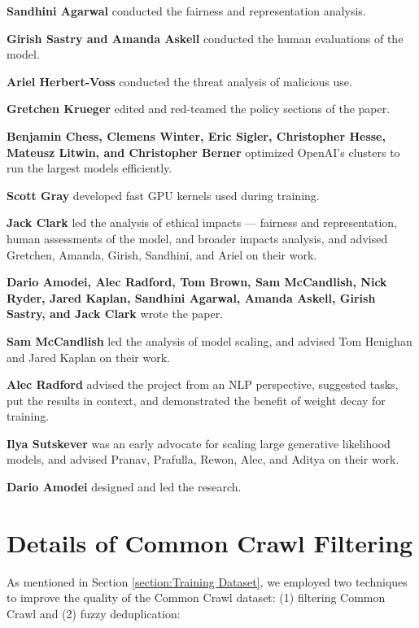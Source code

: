 \documentclass{article}
\begin{document}
\textbf{Sandhini Agarwal} conducted the fairness and representation analysis.

\textbf{Girish Sastry and Amanda Askell} conducted the human evaluations of the model.

\textbf{Ariel Herbert-Voss} conducted the threat analysis of malicious use.

\textbf{Gretchen Krueger} edited and red-teamed the policy sections of the paper.

\textbf{Benjamin Chess, Clemens Winter, Eric Sigler, Christopher Hesse, Mateusz Litwin, and Christopher Berner} optimized OpenAI’s clusters to run the largest models efficiently.

\textbf{Scott Gray} developed fast GPU kernels used during training.

\textbf{Jack Clark} led the analysis of ethical impacts — fairness and representation, human assessments of the model, and broader impacts analysis, and advised Gretchen, Amanda, Girish, Sandhini, and Ariel on their work.

\textbf{Dario Amodei, Alec Radford, Tom Brown, Sam McCandlish, Nick Ryder, Jared Kaplan, Sandhini Agarwal, Amanda Askell, Girish Sastry, and Jack Clark} wrote the paper.

\textbf{Sam McCandlish} led the analysis of model scaling, and advised Tom Henighan and Jared Kaplan on their work.

\textbf{Alec Radford} advised the project from an NLP perspective, suggested tasks, put the results in context, and demonstrated the benefit of weight decay for training.

\textbf{Ilya Sutskever} was an early advocate for scaling large generative likelihood models, and advised Pranav, Prafulla, Rewon, Alec, and Aditya on their work.

\textbf{Dario Amodei} designed and led the research.

\appendix
\clearpage
\newpage
\section{Details of Common Crawl Filtering}
\label{appendix:common_crawl_filtering}
As mentioned in Section \ref{section:Training Dataset}, we employed two techniques to improve the quality of the Common Crawl dataset: (1) filtering Common Crawl and (2) fuzzy deduplication:
\end{document}
